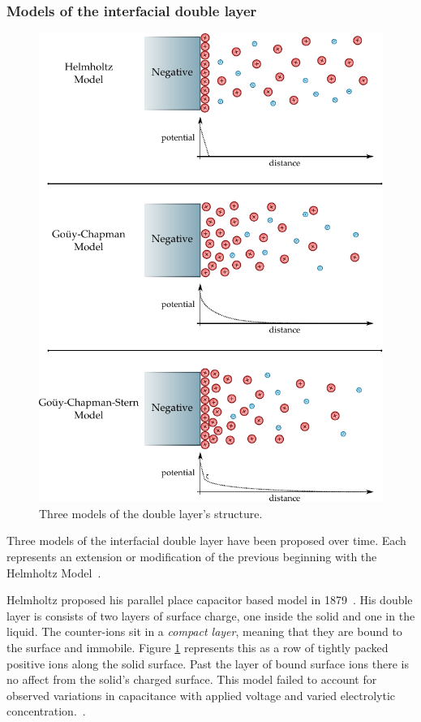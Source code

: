   \subsubsection*{Models of the interfacial double layer}

    \begin{figure}
      \begin{center}
        \includegraphics{content/introduction/graphics/doubleLayerModels}
      \end{center}
      \caption{Three models of the double layer's structure.}
      \label{fig:doubleLayerModels}
    \end{figure}

    Three models of the interfacial double layer have been proposed over time.
    Each represents an extension or modification of the previous beginning with the Helmholtz Model~\cite{Horch2004}.

    Helmholtz proposed his parallel place capacitor based model in 1879~\cite{Geddes1997}.
    His double layer is consists of two layers of surface charge, one inside the solid and one in the liquid.
    The counter-ions sit in a \emph{compact layer}, meaning that they are bound to the surface and immobile.
    Figure \ref{fig:doubleLayerModels} represents this as a row of tightly packed positive ions along the solid surface.
    Past the layer of bound surface ions there is no affect from the solid's charged surface.
    This model failed to account for observed variations in capacitance with applied voltage and varied electrolytic concentration.~\cite{Bard1980}.


